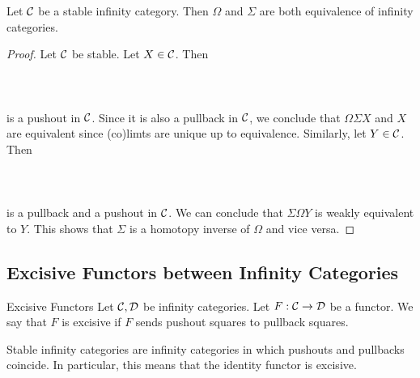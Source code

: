 \documentclass[a4paper]{article}
\begin{document}
\begin{prp}{}{} Let $\mathcal{C}$ be a stable infinity category. Then $\Omega$ and $\Sigma$ are both equivalence of infinity categories. \tcbline
\begin{proof}
Let $\mathcal{C}$ be stable. Let $X\in\mathcal{C}$. Then \\~\\
\\~\\
is a pushout in $\mathcal{C}$. Since it is also a pullback in $\mathcal{C}$, we conclude that $\Omega\Sigma X$ and $X$ are equivalent since (co)limts are unique up to equivalence. Similarly, let $Y\in\mathcal{C}$. Then \\~\\
\\~\\
is a pullback and a pushout in $\mathcal{C}$. We can conclude that $\Sigma\Omega Y$ is weakly equivalent to $Y$. This shows that $\Sigma$ is a homotopy inverse of $\Omega$ and vice versa. 
\end{proof}
\end{prp}

\subsection{Excisive Functors between Infinity Categories}
\begin{defn}{Excisive Functors}{} Let $\mathcal{C},\mathcal{D}$ be infinity categories. Let $F:\mathcal{C}\to\mathcal{D}$ be a functor. We say that $F$ is excisive if $F$ sends pushout squares to pullback squares. 
\end{defn}

Stable infinity categories are infinity categories in which pushouts and pullbacks coincide. In particular, this means that the identity functor is excisive. 
\end{document}
